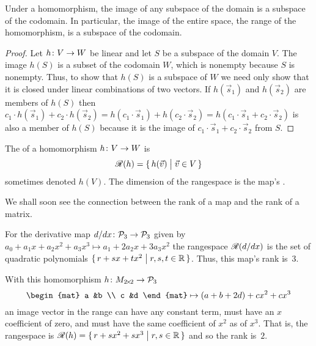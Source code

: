 \begin{lemma}   \label{le:RangeIsSubSp}
Under a homomorphism, the image of
any subspace of the domain is a subspace of the codomain.
In particular, the image of the entire space,
the range of the homomorphism, is a subspace of the codomain.
\end{lemma}

\begin{proof}
Let $\mbox{$h\colon V\to W$}$ be linear and let $S$ be a subspace of the domain 
$V$.
The image $h(S)$ is a subset of the codomain $W$, which is
nonempty because $S$ is nonempty.
Thus, to show that $h(S)$ is a subspace of  $W$
we need only show that it is closed under linear combinations
of two vectors.
If $h(\vec{s}_1)$ and $h(\vec{s}_2)$ are members of $h(S)$ then
$c_1\cdot h(\vec{s}_1)+c_2\cdot h(\vec{s}_2)
  =
  h(c_1\cdot \vec{s}_1)+h(c_2\cdot \vec{s}_2)
  =
  h(c_1\cdot \vec{s}_1+c_2\cdot \vec{s}_2)$
is also a member of $h(S)$ because it is the image of
\( c_1\cdot \vec{s}_1+c_2\cdot \vec{s}_2 \) from \( S \).
\end{proof}

\begin{definition}
The 
of a homomorphism \( \mbox{$h\colon V\to W$} \) is
\begin{equation*}
  \mathscr{R}(h)=\mbox{$\{\,h(\vec{v})\bigm| \vec{v}\in V\,\}$}
\end{equation*}
sometimes denoted \( h(V) \).
The dimension of the rangespace is the map's
.
\end{definition}
\noindent 
We shall soon see the connection between the rank of a map and the rank of a 
matrix.

\begin{example}  \label{ex:DerivMapRnge}
For the derivative map 
\( \mbox{$d/dx\colon \mathcal{P}_3\to \mathcal{P}_3$} \)
given by \( a_0+a_1x+a_2x^2+a_3x^3 \mapsto a_1+2a_2x+3a_3x^2 \)
the rangespace 
\( \mathscr{R}(d/dx) \) is the set of quadratic polynomials
\( \mbox{$\{\,r+sx+tx^2\bigm| r,s,t\in\mathbb{R} \,\}$} \).
Thus, this map's rank is~\( 3 \).
\end{example}

\begin{example}  \label{ex:MatToPolyRnge}
With this homomorphism \( \mbox{$h\colon M_{2 \! \times \! 2}\to \mathcal{P}_3$} \)
\begin{equation*}
  \begin{mat}
    a  &b  \\
    c  &d
  \end{mat}
  \mapsto
  (a+b+2d)+cx^2+cx^3
\end{equation*}
an image vector in the range
can have any constant term, must have an $x$ coefficient of zero,
and must have the same coefficient of $x^2$ as of $x^3$.
That is, the rangespace is
\( \mathscr{R}(h)=\mbox{$\{\,r+sx^2+sx^3\bigm| r,s\in\mathbb{R}\,\}$} \)
and so the rank is~\( 2 \).
\end{example}

